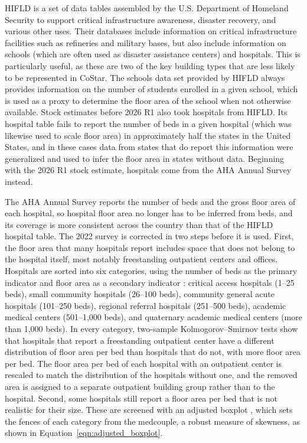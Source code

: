 HIFLD is a set of data tables assembled by the U.S. Department of Homeland Security to support critical infrastructure awareness, disaster recovery, and various other uses. Their databases include information on critical infrastructure facilities such as refineries and military bases, but also include information on schools (which are often used as disaster assistance centers) and hospitals. This is particularly useful, as these are two of the key building types that are less likely to be represented in CoStar. The schools data set provided by HIFLD always provides information on the number of students enrolled in a given school, which is used as a proxy to determine the floor area of the school when not otherwise available. Stock estimates before 2026 R1 also took hospitals from HIFLD. Its hospital table fails to report the number of beds in a given hospital (which was likewise used to scale floor area) in approximately half the states in the United States, and in these cases data from states that do report this information were generalized and used to infer the floor area in states without data. Beginning with the 2026 R1 stock estimate, hospitals come from the AHA Annual Survey instead.

The AHA Annual Survey \citep{aha_annual_survey_2022} reports the number of beds and the gross floor area of each hospital, so hospital floor area no longer has to be inferred from beds, and its coverage is more consistent across the country than that of the HIFLD hospital table. The 2022 survey is corrected in two steps before it is used. First, the floor area that many hospitals report includes space that does not belong to the hospital itself, most notably freestanding outpatient centers and offices. Hospitals are sorted into six categories, using the number of beds as the primary indicator and floor area as a secondary indicator \citep{cms_critical_access_hospitals, definitive_hospital_square_footage}: critical access hospitals (1--25 beds), small community hospitals (26--100 beds), community general acute hospitals (101--250 beds), regional referral hospitals (251--500 beds), academic medical centers (501--1,000 beds), and quaternary academic medical centers (more than 1,000 beds). In every category, two-sample Kolmogorov--Smirnov tests show that hospitals that report a freestanding outpatient center have a different distribution of floor area per bed than hospitals that do not, with more floor area per bed. The floor area per bed of each hospital with an outpatient center is rescaled to match the distribution of the hospitals without one, and the removed area is assigned to a separate outpatient building group rather than to the hospital. Second, some hospitals still report a floor area per bed that is not realistic for their size. These are screened with an adjusted boxplot \citep{hubert2008adjusted}, which sets the fences of each category from the medcouple, a robust measure of skewness, as shown in Equation~\ref{eqn:adjusted_boxplot}.

